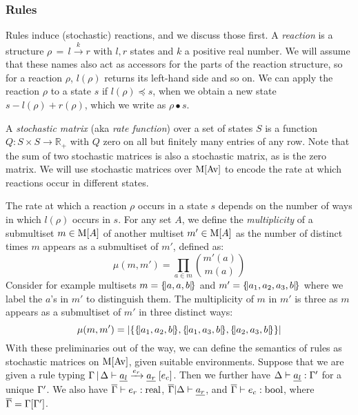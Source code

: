 \subsubsection*{Rules}
\label{sec:ruleSem}
Rules induce (stochastic) reactions, and we discuss those first. A
\emph{reaction} is a structure $\rho \, = \, l \xrightarrow{k} r$ with $l, r$
states and $k$ a positive real number. We will assume that these names also act
as accessors for the parts of the reaction structure, so for a reaction $\rho$,
$l(\rho)$ returns its left-hand side and so on. We can apply the reaction $\rho$ to a
state $s$ if $l(\rho) \preceq s$, when we obtain a new state
$s - l(\rho) + r(\rho) $, which we write as $\rho \bullet s$.

A \emph{stochastic matrix} (aka \emph{rate function}) over a set of states $S$
is a function $Q: S \times S \rightarrow \mathbb{R}_+$ with $Q$ zero on all but finitely many
entries of any row.  Note that the sum of two stochastic matrices is also a
stochastic matrix, as is the zero matrix.  We will use stochastic matrices over
$\mathrm{M}[\mathrm{Av}]$ to encode the rate at which reactions occur in different
states.

The rate at which a reaction $\rho$ occurs in a state $s$ depends on the number of
ways in which $l(\rho)$ occurs in $s$.  For any set $A$, we define the
\emph{multiplicity} of a submultiset $m \in \mathrm{M}[A]$ of another multiset
$m' \in \mathrm{M}[A]$ as the number of distinct times $m$ appears as a submultiset of
$m'$, defined as:
%
$$
\mu(m, m') = \prod_{a \in m}  \binom{m'(a)}{m(a)}
$$
Consider for example multisets $m = \{\!| a, a, b |\!\}$ and $m'= \{\!| a_1, a_2, a_3, b |\!\}$
where we label the $a$'s in $m'$ to distinguish them.  The multiplicity of $m$
in $m'$ is three as $m$ appears as a submultiset of $m'$ in three distinct ways:
$$
\mu(m, m') = |\{ \{\!| a_1, a_2, b |\!\}, \{\!| a_1, a_3, b |\!\}, \{\!| a_2, a_3, b |\!\} \}|$$ With these
preliminaries out of the way, we can define the semantics of rules as stochastic
matrices on $\mathrm{M}[\mathrm{Av}]$, given suitable environments.  Suppose that we
are given a rule typing
$\Gamma\,|\, \Delta \vdash \underline{a_l} \xrightarrow{e_r} \underline{a_r} \; [e_c]$. Then we further
have $\Delta \vdash \underline{a_l} : \Gamma'$ for a unique $\Gamma'$.  We also have
$\overline{\Gamma} \vdash e_r : \mathrm{real}$, $ \overline{\Gamma}|\Delta \vdash \underline{a_r}$, and
$ \overline{\Gamma} \vdash e_c : \mathrm{bool}$, where $\overline{\Gamma} = \Gamma[\Gamma']$.

